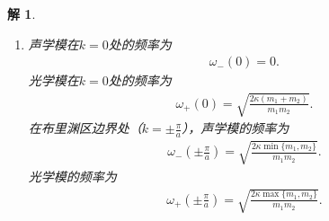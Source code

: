 \documentclass[UTF8,10pt,a4paper]{article}
\theoremstyle{Problem}
\theoremstyle{Solution}
\newtheorem*{sol}{解}
\providecommand{\abs}[1]{\left\lvert#1\right\rvert}
\begin{document}
\begin{sol}
\begin{enumerate}
\begin{align}
\begin{matrix}
            \end{matrix}\right).
        \end{align}
        下面求解上式右侧矩阵的本征值
        \begin{align}
            \nonumber\abs{\begin{matrix}
                \frac{2\kappa}{m_1}-\omega^2&-\frac{\kappa}{m_1}(1+e^{ika})\\
                -\frac{\kappa}{m_2}(1+e^{-ika})&\frac{2\kappa}{m_2}-\omega^2
            \end{matrix}}=&\omega^4-2\kappa\left(\frac{1}{m_1}+\frac{1}{m_2}\right)+\frac{\kappa^2}{m_1m_2}\left(2-2\cos ka\right)\\
            =&\omega^4-2\kappa\left(\frac{1}{m_1}+\frac{1}{m_2}\right)+\frac{4\kappa^2}{m_1m_2}\sin^2\left(\frac{ka}{2}\right)=0,
        \end{align}
        解得
        \begin{align}
            \nonumber\omega_{\pm}^2=&\kappa\left[\left(\frac{1}{m_1}+\frac{1}{m_2}\right)\pm\sqrt{\left(\frac{1}{m_1}+\frac{1}{m_2}\right)^2-\frac{4}{m_1m_2}\sin^2\left(\frac{ka}{2}\right)}\right]\\
            =&\frac{\kappa}{m_1m_2}\left[(m_1+m_2)\pm\sqrt{(m_1+m_2)^2-4m_1m_2\sin^2\left(\frac{ka}{2}\right)}\right].
        \end{align}
        故一维双原晶体纵波的色散关系为
        \begin{align}
            \omega_{\pm}=&\sqrt{\frac{\kappa}{m_1m_2}\left[(m_1+m_2)\pm\sqrt{(m_1+m_2)^2-4m_1m_2\sin^2\left(\frac{ka}{2}\right)}\right]},
        \end{align}
        其中下标$-$代表声学模，$+$代表光学模.
        \item[(c)] 声学模在$k=0$处的频率为
        \begin{align}
            \omega_-(0)=0.
        \end{align}
        光学模在$k=0$处的频率为
        \begin{align}
            \omega_+(0)=\sqrt{\frac{2\kappa(m_1+m_2)}{m_1m_2}}.
        \end{align}
        在布里渊区边界处（$k=\pm\frac{\pi}{a}$），声学模的频率为
        \begin{align}
            \omega_-(\pm\frac{\pi}{a})=\sqrt{\frac{2\kappa\min\{m_1,m_2\}}{m_1m_2}}.
        \end{align}
        光学模的频率为
        \begin{align}
            \omega_+(\pm\frac{\pi}{a})=\sqrt{\frac{2\kappa\max\{m_1,m_2\}}{m_1m_2}}.

\end{align}
\end{enumerate}
\end{sol}
\end{document}
